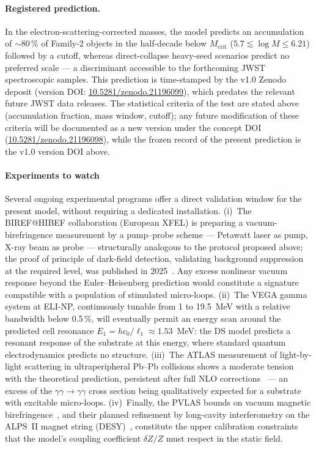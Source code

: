 \documentclass[11pt,a4paper]{article}
\theoremstyle{plain}
\theoremstyle{remark}
\begin{document}
\paragraph{Registered prediction.} In the electron-scattering-corrected masses, the model predicts an accumulation of $\sim80\,\%$ of Family-2 objects in the half-decade below $M_{\text{crit}}$ ($5.7 \lesssim \log M \leq 6.21$) followed by a cutoff, whereas direct-collapse heavy-seed scenarios \cite{jeon2026} predict no preferred scale --- a discriminant accessible to the forthcoming JWST spectroscopic samples. This prediction is time-stamped by the v1.0 Zenodo deposit (version DOI: \href{https://doi.org/10.5281/zenodo.21196099}{10.5281/zenodo.21196099}), which predates the relevant future JWST data releases. The statistical criteria of the test are stated above (accumulation fraction, mass window, cutoff); any future modification of these criteria will be documented as a new version under the concept DOI (\href{https://doi.org/10.5281/zenodo.21196098}{10.5281/zenodo.21196098}), while the frozen record of the present prediction is the v1.0 version DOI above.

\paragraph{Experiments to watch}
Several ongoing experimental programs offer a direct validation window for the present model, without requiring a dedicated installation. (i)~The BIREF@HIBEF collaboration (European XFEL) is preparing a vacuum-birefringence measurement by a pump--probe scheme --- Petawatt laser as pump, X-ray beam as probe --- structurally analogous to the protocol proposed above; the proof of principle of dark-field detection, validating background suppression at the required level, was published in 2025~\cite{BIREF2025, Smid2025}. Any excess nonlinear vacuum response beyond the Euler--Heisenberg prediction would constitute a signature compatible with a population of stimulated micro-loops. (ii)~The VEGA gamma system at ELI-NP, continuously tunable from 1 to 19.5~MeV with a relative bandwidth below 0.5\,\%, will eventually permit an energy scan around the predicted cell resonance $E_1 = h c_0/\ell_1 \approx 1.53$~MeV: the DS model predicts a resonant response of the substrate at this energy, where standard quantum electrodynamics predicts no structure. (iii)~The ATLAS measurement of light-by-light scattering in ultraperipheral Pb--Pb collisions shows a moderate tension with the theoretical prediction, persistent after full NLO corrections~\cite{LbLNLO} --- an excess of the $\gamma\gamma \to \gamma\gamma$ cross section being qualitatively expected for a substrate with excitable micro-loops. (iv)~Finally, the PVLAS bounds on vacuum magnetic birefringence~\cite{PVLAS2020}, and their planned refinement by long-cavity interferometry on the ALPS~II magnet string (DESY)~\cite{ALPSII_VMB}, constitute the upper calibration constraints that the model's coupling coefficient $\delta Z/Z$ must respect in the static field.
\end{document}

